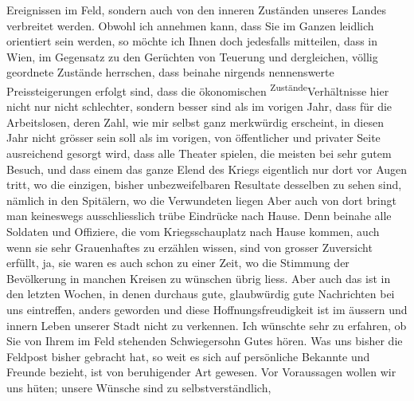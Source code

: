 \begin{ledgroupsized}[t]{13cm}
                    Ereignissen im Feld, sondern auch von den inneren Zuständen unseres Landes
                    verbreitet werden. Obwohl ich annehmen kann, dass Sie im Ganzen \label{LL710-1v}\label{LL710-1h}leidlich orientiert sein werden, so möchte
                    ich Ihnen doch jedesfalls mitteilen, dass in Wien, im Gegensatz zu den Gerüchten von Teuerung und dergleichen,
                    völlig geordnete Zustände herrschen, dass beinahe nirgends nennenswerte
                    Preissteigerungen erfolgt sind, dass die ökonomischen \substVorne{}\textsuperscript{Zustände}{\allowbreak}\substDazwischen{}Verhältnisse\substHinten{} hier nicht nur nicht schlechter, sondern besser sind als im vorigen
                    Jahr, dass für die Arbeitslosen, deren Zahl, wie mir selbst ganz merkwürdig
                    erscheint, in diesen Jahr nicht grösser sein soll als im vorigen, von
                    öffentlicher und privater Seite ausreichend {\pb}gesorgt wird, dass alle Theater spielen, die meisten bei sehr gutem Besuch,
                    und dass einem das ganze Elend des Kriegs eigentlich nur dort vor Augen tritt,
                    wo die einzigen, bisher unbezweifelbaren Resultate desselben zu sehen sind,
                    nämlich in den Spitälern, wo die Verwundeten liegen{\dotstwo}
                    Aber auch von dort bringt man keineswegs ausschliesslich trübe Eindrücke nach
                    Hause. Denn beinahe alle Soldaten und Offiziere, die vom Kriegsschauplatz nach
                    Hause kommen, auch wenn sie sehr Grauenhaftes zu erzählen wissen, sind von
                    grosser Zuversicht erfüllt, ja, sie waren es auch schon zu einer Zeit, wo die
                    Stimmung der Bevölkerung in manchen Kreisen zu wünschen übrig liess. Aber auch
                    das ist in den letzten Wochen, in denen durchaus gute, glaubwürdig gute
                    Nachrichten bei uns eintreffen, anders geworden und diese Hoffnungsfreudigkeit
                    ist im äussern und innern Leben unserer Stadt nicht zu verkennen.\pend
           \pstart
           Ich wünschte sehr zu erfahren, ob {\pb}Sie von
                    Ihrem im Feld stehenden Schwiegersohn Gutes hören. Was uns bisher die Feldpost
                    bisher gebracht hat, so weit es sich auf persönliche Bekannte und
                    Freunde bezieht, ist von beruhigender Art gewesen.\pend
           \pstart
           Vor Voraussagen wollen wir uns hüten; unsere Wünsche sind zu selbstverständlich,

\end{ledgroupsized}
